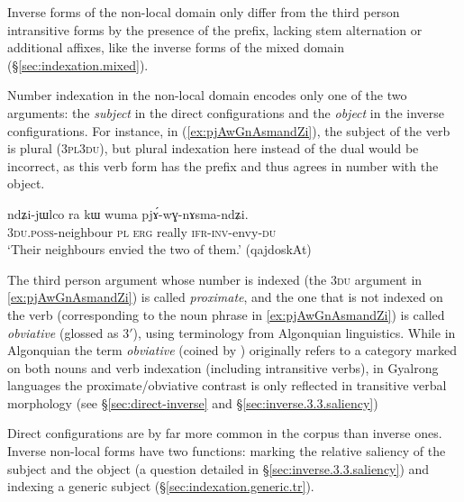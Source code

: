 Inverse forms of the non-local domain only differ from the third person intransitive forms by the presence of the  prefix, lacking stem alternation or additional affixes, like the inverse forms of the mixed domain (§\ref{sec:indexation.mixed}).

Number indexation in the non-local domain encodes only one of the two arguments: the \textit{subject} in the direct configurations and the \textit{object} in the inverse configurations. For instance, in (\ref{ex:pjAwGnAsmandZi}), the subject of the verb  is plural (\textsc{3pl}\fl{}\textsc{3du}), but plural indexation  here instead of the dual would be incorrect, as this verb form has the  prefix and thus agrees in number with the object.

\begin{exe}
\ex   \label{ex:pjAwGnAsmandZi}
\gll ndʑi-jɯlco ra kɯ wuma pjɤ́-wɣ-nɤsma-ndʑi. \\
\textsc{3du}.\textsc{poss}-neighbour \textsc{pl} \textsc{erg} really \textsc{ifr}-\textsc{inv}-envy-\textsc{du} \\
\glt `Their neighbours envied the two of them.' (qajdoskAt)
\end{exe}

The third person argument whose number is indexed (the \textsc{3du} argument in \ref{ex:pjAwGnAsmandZi}) is called \textit{proximate}, and the one that is not indexed on the verb (corresponding to the noun phrase  in \ref{ex:pjAwGnAsmandZi}) is called \textit{obviative} (glossed as 3$'$), using terminology from Algonquian linguistics. While in Algonquian the term \textit{obviative} (coined by \citealt{cuoq1866}) originally refers to a category marked on both nouns and verb indexation (including intransitive verbs), in Gyalrong languages the proximate/obviative contrast is only reflected in transitive verbal morphology (see §\ref{sec:direct-inverse} and §\ref{sec:inverse.3.3.saliency})

Direct configurations are by far more common in the corpus than inverse ones. Inverse non-local forms have two functions: marking the relative saliency of the subject and the object (a question detailed in §\ref{sec:inverse.3.3.saliency}) and indexing a generic subject (§\ref{sec:indexation.generic.tr}).


